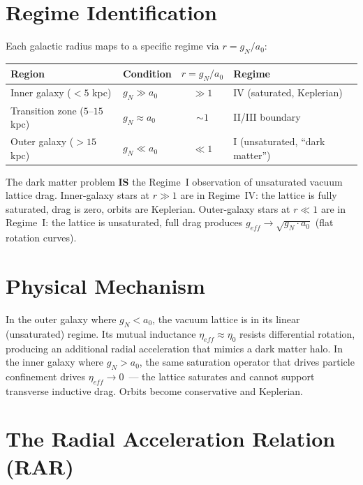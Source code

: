 \section{Regime Identification}
\label{sec:galactic_regimes}

Each galactic radius maps to a specific regime via $r = g_N/a_0$:

\begin{center}
\small
\begin{tabular}{llcl}
\toprule
\textbf{Region} & \textbf{Condition} & \textbf{$r = g_N/a_0$} & \textbf{Regime} \\
\midrule
Inner galaxy ($< 5$ kpc) & $g_N \gg a_0$ & $\gg 1$ & IV (saturated, Keplerian) \\
Transition zone ($5$--$15$ kpc) & $g_N \approx a_0$ & $\sim 1$ & II/III boundary \\
Outer galaxy ($> 15$ kpc) & $g_N \ll a_0$ & $\ll 1$ & I (unsaturated, ``dark matter'') \\
\bottomrule
\end{tabular}
\end{center}

\noindent The dark matter problem \textbf{IS} the Regime~I observation of unsaturated vacuum lattice drag.  Inner-galaxy stars at $r \gg 1$ are in Regime~IV: the lattice is fully saturated, drag is zero, orbits are Keplerian.  Outer-galaxy stars at $r \ll 1$ are in Regime~I: the lattice is unsaturated, full drag produces $g_{eff} \to \sqrt{g_N \cdot a_0}$ (flat rotation curves).

\section{Physical Mechanism}

In the outer galaxy where $g_N < a_0$,
the vacuum lattice is in its linear (unsaturated) regime.  Its mutual
inductance $\eta_{eff} \approx \eta_0$ resists differential rotation,
producing an additional radial acceleration that mimics a dark matter
halo.  In the inner galaxy where $g_N > a_0$, the same saturation
operator that drives particle confinement drives
$\eta_{eff} \to 0$~--- the lattice saturates and cannot support
transverse inductive drag.  Orbits become conservative and Keplerian.

\section{The Radial Acceleration Relation (RAR)}
\label{sec:rar}

